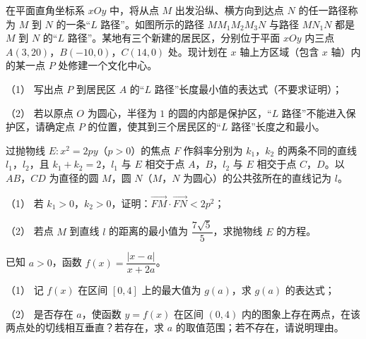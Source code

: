 \begin{question}
在平面直角坐标系 $xOy$ 中，将从点 $M$ 出发沿纵、横方向到达点 $N$ 的任一路径称为 $M$ 到 $N$ 的一条“$L$ 路径”。如图所示的路径 $MM_1M_2M_3N$ 与路径 $MN_1N$ 都是 $M$ 到 $N$ 的“$L$ 路径”。某地有三个新建的居民区，分别位于平面 $xOy$ 内三点 $A(3,20)$，$B(-10,0)$，$C(14,0)$ 处。现计划在 $x$ 轴上方区域（包含 $x$ 轴）内的某一点 $P$ 处修建一个文化中心。

（1） 写出点 $P$ 到居民区 $A$ 的“$L$ 路径”长度最小值的表达式（不要求证明）；

（2） 若以原点 $O$ 为圆心，半径为 $1$ 的圆的内部是保护区，“$L$ 路径”不能进入保护区，请确定点 $P$ 的位置，使其到三个居民区的“$L$ 路径”长度之和最小。
\nopagebreak[4]
\begin{center}\end{center}
\nopagebreak[4]
\end{question}
\begin{question}
过抛物线 $E:x^2=2py$（$p>0$）的焦点 $F$ 作斜率分别为 $k_1$，$k_2$ 的两条不同的直线 $l_1$，$l_2$，且 $k_1+k_2=2$，$l_1$ 与 $E$ 相交于点 $A$，$B$，$l_2$ 与 $E$ 相交于点 $C$，$D$。以 $AB$，$CD$ 为直径的圆 $M$，圆 $N$（$M$，$N$ 为圆心）的公共弦所在的直线记为 $l$。

（1） 若 $k_1>0$，$k_2>0$，证明：$\overrightarrow{FM}\cdot\overrightarrow{FN}<2p^2$；

（2） 若点 $M$ 到直线 $l$ 的距离的最小值为 $\dfrac{7\sqrt5}{5}$，求抛物线 $E$ 的方程。

\end{question}
\begin{question}
已知 $a>0$，函数 $f(x)=\dfrac{|x-a|}{x+2a}$。

（1） 记 $f(x)$ 在区间 $[0,4]$ 上的最大值为 $g(a)$，求 $g(a)$ 的表达式；

（2） 是否存在 $a$，使函数 $y=f(x)$ 在区间 $(0,4)$ 内的图象上存在两点，在该两点处的切线相互垂直？若存在，求 $a$ 的取值范围；若不存在，请说明理由。

\end{question}